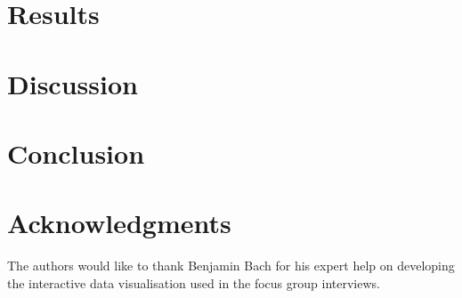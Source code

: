 \documentclass[10pt,twocolumn]{article}
\begin{document}



\section{Results}
\label{sec:results}



\section{Discussion}
\label{sec:discussion}





\section{Conclusion}

\label{sec:conclusion}




\section*{Acknowledgments}


The authors would like to thank Benjamin Bach for his expert help on
developing the interactive data visualisation used in the focus group interviews.


\printbibliography 
\end{document}

